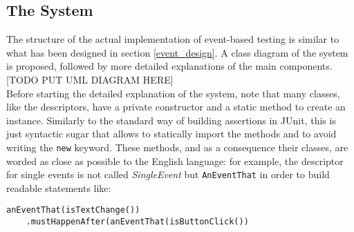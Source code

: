 \documentclass[11pt,a4paper,notitlepage]{article}
\begin{document}
\subsection{The System}
The structure of the actual implementation of event-based testing is similar to what has been designed in section \ref{event_design}. A class diagram of the system is proposed, followed by more detailed explanations of the main components.\medskip \\

[TODO PUT UML DIAGRAM HERE]\medskip \\

Before starting the detailed explanation of the system, note that many classes, like the descriptors, have a private constructor and a static method to create an instance. Similarly to the standard way of building assertions in JUnit, this is just syntactic sugar that allows to statically import the methods and to avoid writing the \texttt{new} keyword. These methods, and as a consequence their classes, are worded as close as possible to the English language: for example, the descriptor for single events is not called \textit{SingleEvent} but \texttt{AnEventThat} in order to build readable statements like:
\begin{lstlisting}
anEventThat(isTextChange())
	.mustHappenAfter(anEventThat(isButtonClick())
\end{lstlisting}
\end{document}
